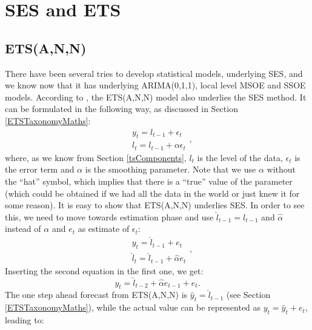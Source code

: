 \documentclass[
]{book}
\theoremstyle{definition}
\theoremstyle{definition}
\theoremstyle{definition}
\theoremstyle{definition}
\theoremstyle{remark}
\begin{document}
\hypertarget{SESandETS}{%
\section{SES and ETS}\label{SESandETS}}

\hypertarget{etsann}{%
\subsection{ETS(A,N,N)}\label{etsann}}

There have been several tries to develop statistical models, underlying SES, and we know now that it has underlying ARIMA(0,1,1), local level MSOE \citep[Multiple Source of Error,][]{Muth1960} and SSOE \citep[Single Source of Error,][]{Snyder1985} models. According to \citep{Hyndman2002}, the ETS(A,N,N) model also underlies the SES method. It can be formulated in the following way, as discussed in Section \ref{ETSTaxonomyMaths}:
\begin{equation}
  \begin{aligned}
    & y_{t} = l_{t-1} + \epsilon_t \\
    & l_t = l_{t-1} + \alpha \epsilon_t
  \end{aligned} ,
  \label{eq:ETSANN}
\end{equation}
where, as we know from Section \ref{tsComponents}, \(l_t\) is the level of the data, \(\epsilon_t\) is the error term and \(\alpha\) is the smoothing parameter. Note that we use \(\alpha\) without the ``hat'' symbol, which implies that there is a ``true'' value of the parameter (which could be obtained if we had all the data in the world or just knew it for some reason). It is easy to show that ETS(A,N,N) underlies SES. In order to see this, we need to move towards estimation phase and use \(\hat{l}_{t-1}=l_{t-1}\) and \(\hat{\alpha}\) instead of \(\alpha\) and \(e_t\) as estimate of \(\epsilon_t\):
\begin{equation}
  \begin{aligned}
    & y_{t} = \hat{l}_{t-1} + e_t \\
    & \hat{l}_t = \hat{l}_{t-1} + \hat{\alpha} e_t
  \end{aligned} ,
  \label{eq:ETSANNEstimation}
\end{equation}
Inserting the second equation in the first one, we get:
\begin{equation}
    y_{t} = \hat{l}_{t-2} + \hat{\alpha} e_{t-1} + e_t .
  \label{eq:ETSANNEstimation01}
\end{equation}
The one step ahead forecast from ETS(A,N,N) is \(\hat{y}_t=\hat{l}_{t-1}\) (see Section \ref{ETSTaxonomyMaths}), while the actual value can be represented as \(y_t = \hat{y}_t + e_t\), leading to:
\end{document}
